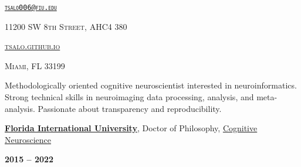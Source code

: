 \documentclass[10pt]{article}
\date{}
\newcommand{\namestyle}{\Huge \fontfamily{lmr}\selectfont}
\newcommand{\iconstyle}{\LARGE}
\newcommand{\headstyle}{\scshape \normalsize \textcolor{light-gray}}
\newcommand{\sectionstyle}{\LARGE \fontfamily{lmr}\selectfont}
\begin{document}
\begin{center}
	\namestyle{TAYLOR SALO}

	\bigskip

	\iconstyle{\href{https://github.com/tsalo}{\faGithubSquare}}
	\enspace
	\iconstyle{\href{https://orcid.org/0000-0001-9813-3167}{}}
	\enspace
	\iconstyle{\href{https://scholar.google.com/citations?user=YbH1akIAAAAJ}{}}
	\enspace
	\iconstyle{\href{https://osf.io/iwpvm/}{}}
\end{center}

\begin{minipage}[t]{.5\linewidth}
\flushleft
\headstyle{\href{mailto:tsalo006@fiu.edu}{\nolinkurl{tsalo006@fiu.edu}}}
\end{minipage}
\hfill
\begin{minipage}[t]{.5\linewidth}
\flushright
\headstyle{11200 SW 8th Street, AHC4 380}
\end{minipage}

\begin{minipage}[t]{.3\linewidth}
\flushleft
\headstyle{\href{https://tsalo.github.io}{tsalo.github.io}}
\end{minipage}
\hfill
\begin{minipage}[t]{.7\linewidth}
\flushright
\headstyle{Miami, FL 33199}
\end{minipage}


\bigskip

\begin{center}\sectionstyle{PROFILE}\end{center}

Methodologically oriented cognitive neuroscientist interested in
neuroinformatics. Strong technical skills in neuroimaging data
processing, analysis, and meta-analysis. Passionate about transparency
and reproducibility.

\bigskip

\begin{center}\sectionstyle{EDUCATION}\end{center}

\begin{minipage}[t]{.7\linewidth}
\flushleft
\noindent
\href{https://fiu.edu}{\textbf{Florida International University}},
Doctor of Philosophy,
\href{https://case.fiu.edu/psychology/phd-in-cognitive-neuroscience/}{Cognitive Neuroscience}
\end{minipage}
\hfill
\begin{minipage}[t]{.3\linewidth}
\flushright
\noindent
\textsc{\textbf{2015 -- 2022}}
\end{minipage}
\end{document}
